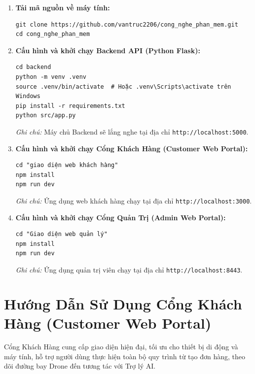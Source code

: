 \begin{enumerate}[leftmargin=*,itemsep=2pt,topsep=2pt]
  \item \textbf{Tải mã nguồn về máy tính:}
\begin{verbatim}
git clone https://github.com/vantruc2206/cong_nghe_phan_mem.git
cd cong_nghe_phan_mem
\end{verbatim}

  \item \textbf{Cấu hình và khởi chạy Backend API (Python Flask):}
\begin{verbatim}
cd backend
python -m venv .venv
source .venv/bin/activate  # Hoặc .venv\Scripts\activate trên Windows
pip install -r requirements.txt
python src/app.py
\end{verbatim}
    \textit{Ghi chú:} Máy chủ Backend sẽ lắng nghe tại địa chỉ \texttt{http://localhost:5000}.

  \item \textbf{Cấu hình và khởi chạy Cổng Khách Hàng (Customer Web Portal):}
\begin{verbatim}
cd "giao diện web khách hàng"
npm install
npm run dev
\end{verbatim}
    \textit{Ghi chú:} Ứng dụng web khách hàng chạy tại địa chỉ \texttt{http://localhost:3000}.

  \item \textbf{Cấu hình và khởi chạy Cổng Quản Trị (Admin Web Portal):}
\begin{verbatim}
cd "Giao diện web quản lý"
npm install
npm run dev
\end{verbatim}
    \textit{Ghi chú:} Ứng dụng quản trị viên chạy tại địa chỉ \texttt{http://localhost:8443}.
\end{enumerate}

\section{Hướng Dẫn Sử Dụng Cổng Khách Hàng (Customer Web Portal)}

Cổng Khách Hàng cung cấp giao diện hiện đại, tối ưu cho thiết bị di động và máy tính, hỗ trợ người dùng thực hiện toàn bộ quy trình từ tạo đơn hàng, theo dõi đường bay Drone đến tương tác với Trợ lý AI.

